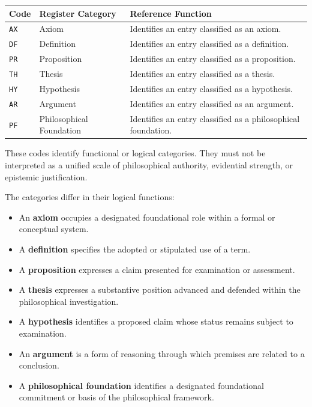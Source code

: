 \begin{center}
\small
\setlength{\tabcolsep}{4pt}
\begin{tabularx}{\textwidth}{
    >{\raggedright\arraybackslash}p{}
    >{\raggedright\arraybackslash}p{}
    >{\raggedright\arraybackslash}X
}
\toprule
\textbf{Code} &
\textbf{Register Category} &
\textbf{Reference Function}
\\
\midrule

\texttt{AX}
&
Axiom
&
Identifies an entry classified as an axiom.
\\

\texttt{DF}
&
Definition
&
Identifies an entry classified as a definition.
\\

\texttt{PR}
&
Proposition
&
Identifies an entry classified as a proposition.
\\

\texttt{TH}
&
Thesis
&
Identifies an entry classified as a thesis.
\\

\texttt{HY}
&
Hypothesis
&
Identifies an entry classified as a hypothesis.
\\

\texttt{AR}
&
Argument
&
Identifies an entry classified as an argument.
\\

\texttt{PF}
&
Philosophical Foundation
&
Identifies an entry classified as a philosophical
foundation.
\\
\bottomrule
\end{tabularx}
\end{center}

These codes identify functional or logical categories.
They must not be interpreted as a unified scale of
philosophical authority, evidential strength, or
epistemic justification.

The categories differ in their logical functions:

\begin{itemize}
    \item An \textbf{axiom} occupies a designated foundational
          role within a formal or conceptual system.
    \item A \textbf{definition} specifies the adopted or
          stipulated use of a term.
    \item A \textbf{proposition} expresses a claim presented
          for examination or assessment.
    \item A \textbf{thesis} expresses a substantive position
          advanced and defended within the philosophical
          investigation.
    \item A \textbf{hypothesis} identifies a proposed claim
          whose status remains subject to examination.
    \item An \textbf{argument} is a form of reasoning through
          which premises are related to a conclusion.
    \item A \textbf{philosophical foundation} identifies a
          designated foundational commitment or basis of
          the philosophical framework.
\end{itemize}

